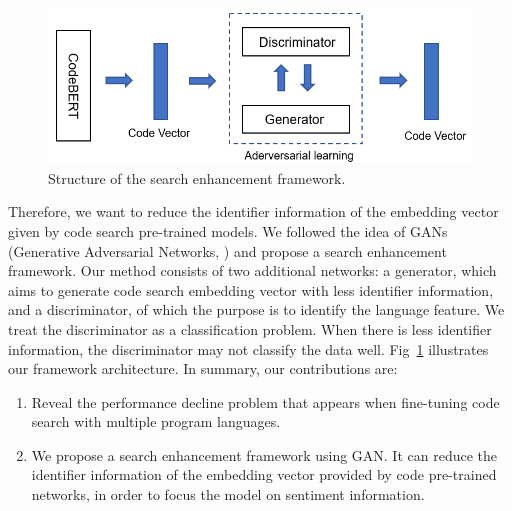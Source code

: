\begin{figure}[htb]
	\centering
	\includegraphics[width=1\linewidth]{imgs/structure.png}
	\caption{Structure of the search enhancement framework.}
	\label{fig:structure}
\end{figure}

Therefore, we want to reduce the identifier information of the embedding vector given by code search pre-trained models. We followed the idea of GANs (Generative Adversarial Networks, \citealp{goodfellow2020generative}) and propose a search enhancement framework. Our method consists of two additional networks: a generator, which aims to generate code search embedding vector with less identifier information, and a discriminator, of which the purpose is to identify the language feature. We treat the discriminator as a classification problem. When there is less identifier information, the discriminator may not classify the data well. Fig~\ref{fig:structure} illustrates our framework architecture.
In summary, our contributions are:
\begin{enumerate} 
\item Reveal the performance decline problem that appears when fine-tuning code search with multiple program languages.
\item We propose a search enhancement framework using GAN. It can reduce the identifier information of the embedding vector provided by code pre-trained networks, in order to focus the model on sentiment information.
\end{enumerate} 



